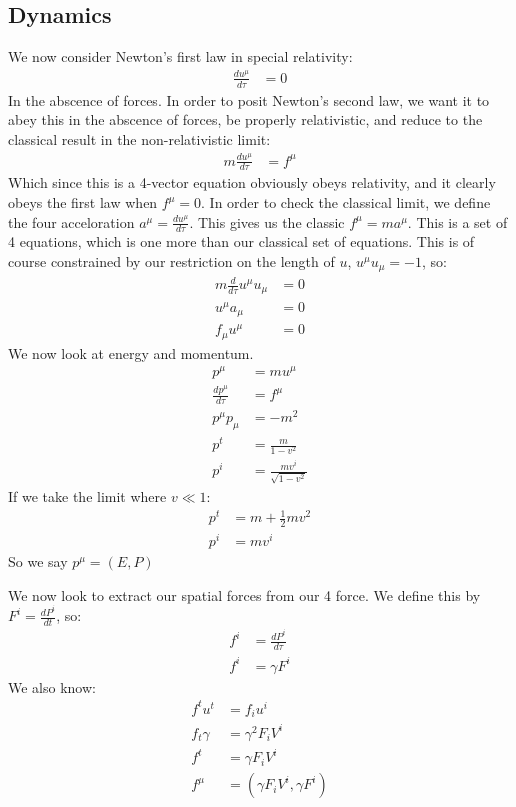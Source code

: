 \subsection{Dynamics}
We now consider Newton's first law in special relativity:
\begin{align*}
	\frac{d u^\mu}{d\tau} &= 0
\end{align*}
In the abscence of forces. In order to posit Newton's second law, we want it to abey this in the abscence of forces, be properly relativistic, and reduce to the classical result in the non-relativistic limit:
\begin{align*}
	m\frac{du^\mu}{d\tau} &= f^\mu
\end{align*}
Which since this is a 4-vector equation obviously obeys relativity, and it clearly obeys the first law when $f^\mu =0$. In order to check the classical limit, we define the four acceloration $a^\mu = \frac{du^\mu}{d\tau}$.
This gives us the classic $f^\mu = m a^\mu$. This is a set of 4 equations, which is one more than our classical set of equations. This is of course constrained by our restriction on the length of $u$, $u^\mu u_\mu = -1$, so:
\begin{align*}
	m \frac{d}{d\tau} u^\mu u_\mu &= 0 \\
	u^\mu a_\mu &= 0 \\
	f_\mu u^\mu &=0
\end{align*}
We now look at energy and momentum.
\begin{align*}
	p^\mu &= m u^\mu \\
	\frac{dp^\mu}{d\tau} &= f^\mu \\p^\mu p_\mu &= -m^2 \\
	p^t &= \frac{m}{1-v^2} \\
	p^i &= \frac{mv^i}{\sqrt{1-v^2}}
\end{align*}
If we take the limit where $v\ll 1$:
\begin{align*}
	p^t &= m + \frac{1}{2} mv^2 \\
	p^i &= mv^i
\end{align*}
So we say $p^\mu = (E, P)$

We now look to extract our spatial forces from our 4 force. We define this by $F^i = \frac{dP^i}{dt}$, so:
\begin{align*}
	f^i &= \frac{dP^i}{d\tau} \\
	f^i &= \gamma F^i
\end{align*}
We also know:
\begin{align*}
	f^t u^t &= f_i u^i \\
	f_t\gamma &= \gamma^2 F_i V^i \\
	f^t &= \gamma F_i V^i \\
	f^\mu &= (\gamma F_i V^i, \gamma F^i)
\end{align*}
